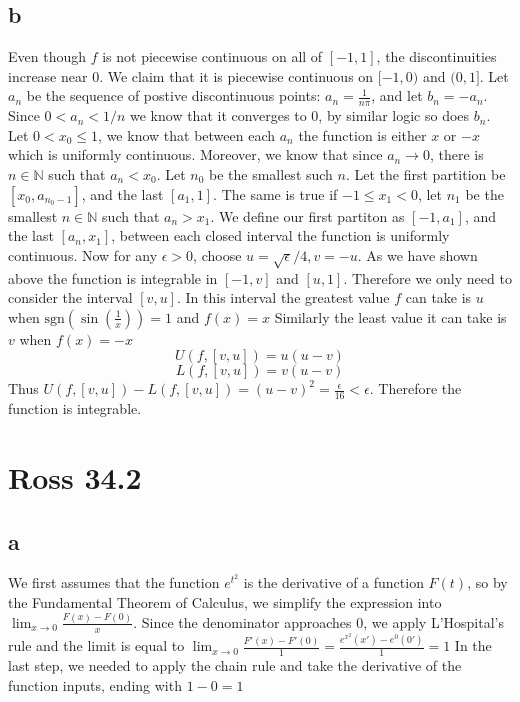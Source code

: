 \documentclass[12pt]{article}
\newcommand{\N}{\mathbb{N}}
\begin{document}
\subsection{b}
Even though $f$ is not piecewise continuous on all of $[-1,1]$, the discontinuities increase near 0. We claim that it is piecewise continuous on $[-1,0)$ and $(0,1]$. Let $a_n$ be the sequence of postive discontinuous points: $a_n = \frac{1}{n\pi}$, and let $b_n=-a_n$. Since $0<a_n < 1/n$ we know that it converges to $0$, by similar logic so does $b_n$.
Let $0<x_0\leq 1$, we know that between each $a_n$ the function is either $x$ or $-x$ which is uniformly continuous. Moreover, we know that since $a_n \to 0$, there is $n \in \N$ such that $a_n < x_0$. Let $n_0$ be the smallest such $n$. Let the first partition be $[x_0, a_{n_0-1}]$, and the last $[a_1,1]$.
The same is true if $-1 \leq x_1 < 0$, let $n_1$ be the smallest $n \in \N$ such that $a_{n} > x_1$. We define our first partiton as $[-1,a_1]$, and the last $[a_{n},x_1]$, between each closed interval the function is uniformly continuous.
\newline
Now for any $\epsilon > 0$, choose $u = \sqrt{\epsilon}/4, v = - u$. As we have shown above the function is integrable in $[-1,v]$ and $[u,1]$. Therefore we only need to consider the interval $[v,u]$. In this interval the greatest value $f$ can take is $u$ when $\text{sgn}(\sin(\frac{1}{x}))=1$ and $f(x)=x$
Similarly the least value it can take is $v$ when $f(x)=-x$
$$U(f,[v,u]) = u(u-v)$$
$$L(f, [v,u]) = v(u-v)$$
Thus $U(f,[v,u])-L(f, [v,u]) = (u-v)^2 = \frac{\epsilon}{16} < \epsilon$. Therefore the function is integrable.
\newpage


\section{Ross 34.2}
\subsection{a}
We first assumes that the function $e^{t^2}$ is the derivative of a function $F(t)$, so by the Fundamental Theorem of Calculus, we simplify the expression into $\lim_{x \to 0} \frac{F(x)-F(0)}{x}$.
Since the denominator approaches 0, we apply L'Hospital's rule and the limit is equal to $\lim_{x \to 0} \frac{F'(x)-F'(0)}{1} = \frac{e^{x^2}(x')-e^0(0')}{1} = 1$
\newline
In the last step, we needed to apply the chain rule and take the derivative of the function inputs, ending with $1-0=1$
\end{document}
